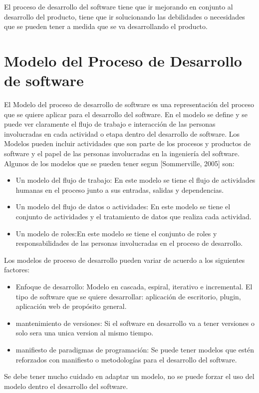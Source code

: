 \noindent El proceso de desarrollo del software tiene que ir mejorando en conjunto al desarrollo del producto, tiene que ir solucionando las debilidades o necesidades que se pueden tener a medida que se va desarrollando el producto.
 
\section{Modelo del Proceso de Desarrollo de software}
\noindent El Modelo del proceso de desarrollo de software es una representación del proceso que se quiere aplicar para el desarrollo del software. En el modelo se define y se puede ver claramente el flujo de trabajo e interacción de las personas involucradas en cada actividad o etapa dentro del desarrollo de software.
\noindent Los Modelos pueden incluir actividades que son parte de los procesos y productos de software y el papel de las personas involucradas en la ingeniería del software. Algunos de los modelos que se pueden tener segun [Sommerville, 2005] son:
\begin{itemize}
\item Un modelo del flujo de trabajo: En este modelo se tiene el flujo de actividades humanas en el proceso junto a sus entradas, salidas y dependencias.
\item Un modelo del flujo de datos o actividades: En este modelo se tiene el conjunto de actividades y el tratamiento de datos que realiza cada actividad.
\item Un modelo de roles:En este modelo se tiene el conjunto de roles y responsabilidades de las personas involucradas en el proceso de desarrollo.
\end{itemize}

\noindent Los modelos de proceso de desarrollo pueden variar de acuerdo a los siguientes factores:
\begin{itemize}
\item Enfoque de desarrollo: Modelo en cascada, espiral, iterativo e incremental.
El tipo de software que se quiere desarrollar: aplicación de escritorio, plugin, aplicación web de propósito general.
\item mantenimiento de versiones: Si el software en desarrollo va a tener versiones o solo sera una unica version al mismo tiempo.
\item manifiesto de paradigmas de programación: Se puede tener modelos que estén reforzados con manifiesto o metodologías para el desarrollo del software.
\end{itemize}
\noindent Se debe tener mucho cuidado en adaptar un modelo, no se puede forzar el uso del modelo dentro el desarrollo del software.   

